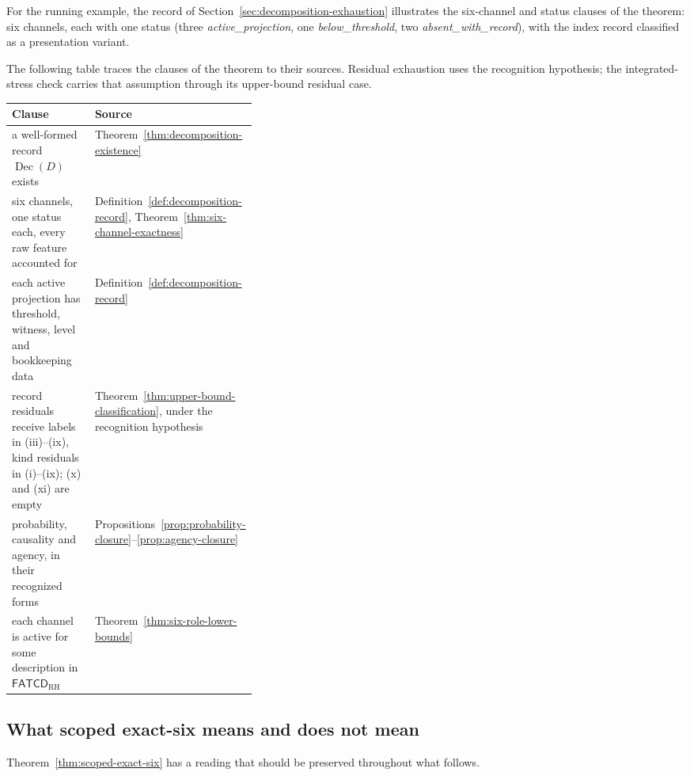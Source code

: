 \documentclass[11pt]{article}
\theoremstyle{definition}
\newcommand{\FATCD}{\ensuremath{\mathsf{FATCD}}}
\newcommand{\Dec}[1]{\ensuremath{\operatorname{Dec}\!\left(#1\right)}}
\newcommand{\activeproj}{\textit{active\_\allowbreak projection}}
\newcommand{\belowthr}{\textit{below\_\allowbreak threshold}}
\newcommand{\absentrec}{\textit{absent\_\allowbreak with\_\allowbreak record}}
\begin{document}
For the running example, the record of Section~\ref{sec:decomposition-exhaustion}
illustrates the six-channel and status clauses of the theorem: six channels,
each with one status (three \activeproj{}, one \belowthr{}, two
\absentrec{}), with the index record classified as a presentation variant.

The following table traces the clauses of the theorem to their sources.
Residual exhaustion uses the recognition hypothesis; the integrated-stress check
carries that assumption through its upper-bound residual case.
\begin{center}
\small
\begin{tabularx}{\linewidth}{@{}>{\raggedright\arraybackslash}X>{\raggedright\arraybackslash}p{0.36\linewidth}@{}}
\toprule
Clause & Source \\
\midrule
a well-formed record \(\Dec{D}\) exists & Theorem~\ref{thm:decomposition-existence} \\
six channels, one status each, every raw feature accounted for & Definition~\ref{def:decomposition-record}, Theorem~\ref{thm:six-channel-exactness} \\
each active projection has threshold, witness, level and bookkeeping data & Definition~\ref{def:decomposition-record} \\
record residuals receive labels in (iii)--(ix), kind residuals in (i)--(ix); (x) and (xi) are empty & Theorem~\ref{thm:upper-bound-classification}, under the recognition hypothesis \\
probability, causality and agency, in their recognized forms & Propositions~\ref{prop:probability-closure}--\ref{prop:agency-closure} \\
each channel is active for some description in \(\FATCD_{\mathrm{RH}}\) & Theorem~\ref{thm:six-role-lower-bounds} \\
\bottomrule
\end{tabularx}
\end{center}

\subsection{What scoped exact-six means and does not mean}\label{subsec:exact-six-meaning}

Theorem~\ref{thm:scoped-exact-six} has a reading that should be
preserved throughout what follows.
\end{document}
